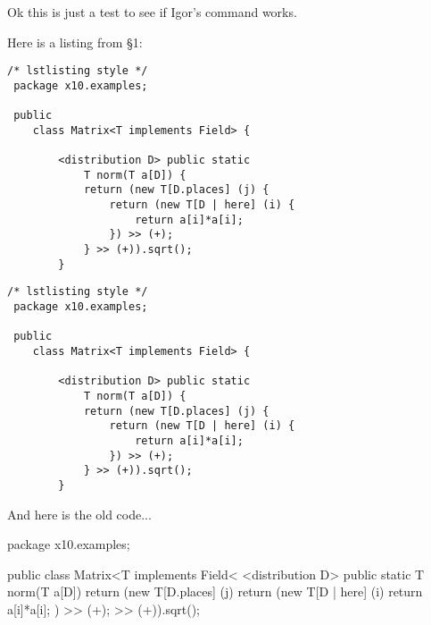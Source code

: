 \documentclass{article}
\begin{document}
\def\smallcf{\small\cf}
\lstset{language=X10,basicstyle=\small\cf,fancyvrb=true}

Ok this is just a test to see if Igor's command works.

Here is a listing from \S 1: \markmod{0.4in}

\begin{lstlisting}
/* lstlisting style */
 package x10.examples;

 public 
    class Matrix<T implements Field> {

        <distribution D> public static
            T norm(T a[D]) {
            return (new T[D.places] (j) {
                return (new T[D | here] (i) {
                    return a[i]*a[i];
                }) >> (+);
            } >> (+)).sqrt();
        }
\end{lstlisting}

\begin{lstlisting}[fontadjust]
/* lstlisting style */
 package x10.examples;

 public 
    class Matrix<T implements Field> {

        <distribution D> public static
            T norm(T a[D]) {
            return (new T[D.places] (j) {
                return (new T[D | here] (i) {
                    return a[i]*a[i];
                }) >> (+);
            } >> (+)).sqrt();
        }
\end{lstlisting}

And here is the old code...

\begin{x10noindent}
 package x10.examples;

 public
  class Matrix<T implements Field< {
        <distribution D> public static
            T norm(T a[D]) {
            return (new T[D.places] (j) {
                return (new T[D | here] (i){
                    return a[i]*a[i];
                }) >> (+);
            } >> (+)).sqrt();
        }%
}
\end{x10noindent}
\end{document}
